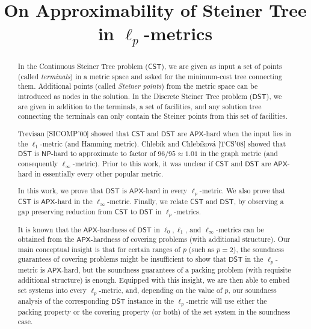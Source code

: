 \documentclass{theoretics}
\title{On Approximability of Steiner Tree in \texorpdfstring{$\ell_p$}{lp}-metrics}
\newcommand{\1}{\textbf{1}}
\newcommand{\cst}{$\mathsf{CST}$\xspace}
\newcommand{\dst}{$\mathsf{DST}$\xspace}
\newcommand{\np}{$\mathsf{NP}$\xspace}
\newcommand{\apx}{$\mathsf{APX}$\xspace}
\begin{document}
\maketitle

\begin{abstract}
In the Continuous Steiner Tree problem (\cst), we are given as input a set of points (called \emph{terminals}) in a metric space and asked for the minimum-cost tree connecting them. Additional points (called \emph{Steiner points}) from the metric space can be introduced as nodes in the solution. In the Discrete Steiner Tree problem (\dst), we are given in addition to the terminals, a set of facilities, and any solution tree connecting the terminals can only contain the Steiner points from this set of facilities. %

Trevisan [SICOMP'00] showed that \cst and \dst are \apx-hard when the input lies in the $\ell_1$-metric (and Hamming metric). Chleb\'ik and Chleb\'ikov\'a [TCS'08] showed that \dst is \np-hard to approximate to factor of $96/95\approx 1.01$ in the graph metric (and consequently $\ell_\infty$-metric). Prior to this work, it was unclear if \cst and \dst are \apx-hard in essentially every other popular metric. %

In this work, we prove that \dst is \apx-hard in every $\ell_p$-metric. We also prove that \cst is \apx-hard in the $\ell_{\infty}$-metric. Finally, we relate \cst and \dst, by observing a gap preserving reduction from \cst to \dst in $\ell_p$-metrics. 


 
 It is known that the \apx-hardness of \dst in $\ell_0,\ell_1$, and $\ell_\infty$-metrics  can be obtained from the {\apx-hardness} of covering problems (with additional structure). 
Our main conceptual insight is that for certain ranges of $p$ (such as $p=2$), the soundness guarantees of covering problems might be insufficient to show that  \dst in the $\ell_p$-metric is \apx-hard, but the soundness guarantees of a packing problem (with requisite additional structure) is enough. Equipped with this insight, we are then able to embed set systems into every $\ell_p$-metric, and, depending on the value of $p$, our soundness analysis of the corresponding \dst instance in the $\ell_p$-metric will use either the packing property or the covering property (or both) of the set system in the soundness case.  %



\end{abstract}
\end{document}
